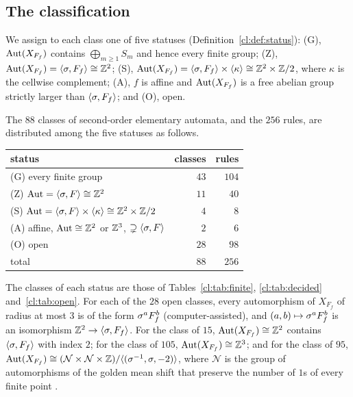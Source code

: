 \subsection{The classification}

We assign to each class one of five statuses (Definition~\ref{cl:def:status}): (G), $\operatorname{Aut}(X_{F_f})$ contains $\bigoplus_{m\ge1}S_m$ and hence every finite group; (Z), $\operatorname{Aut}(X_{F_f})=\langle\sigma,F_f\rangle\cong\mathbb{Z}^2$; (S), $\operatorname{Aut}(X_{F_f})=\langle\sigma,F_f\rangle\times\langle\kappa\rangle\cong\mathbb{Z}^2\times\mathbb{Z}/2$, where $\kappa$ is the cellwise complement; (A), $f$ is affine and $\operatorname{Aut}(X_{F_f})$ is a free abelian group strictly larger than $\langle\sigma,F_f\rangle$; and (O), open.

\begin{theorem}[Classification]\label{thm:main}
The $88$ classes of second-order elementary automata, and the $256$ rules, are distributed among the five statuses as follows.
\begin{center}
\begin{tabular}{lrr}
\toprule
status & classes & rules\\
\midrule
(G) every finite group & $43$ & $104$\\
(Z) $\operatorname{Aut}=\langle\sigma,F\rangle\cong\mathbb{Z}^2$ & $11$ & $40$\\
(S) $\operatorname{Aut}=\langle\sigma,F\rangle\times\langle\kappa\rangle\cong\mathbb{Z}^2\times\mathbb{Z}/2$ & $4$ & $8$\\
(A) affine, $\operatorname{Aut}\cong\mathbb{Z}^2$ or $\mathbb{Z}^3$, $\supsetneq\langle\sigma,F\rangle$ & $2$ & $6$\\
(O) open & $28$ & $98$\\
\midrule
total & $88$ & $256$\\
\bottomrule
\end{tabular}
\end{center}
The classes of each status are those of Tables~\ref{cl:tab:finite}, \ref{cl:tab:decided} and~\ref{cl:tab:open}. For each of the $28$ open classes, every automorphism of $X_{F_f}$ of radius at most $3$ is of the form $\sigma^aF_f^b$ (computer-assisted), and $(a,b)\mapsto\sigma^aF_f^b$ is an isomorphism $\mathbb{Z}^2\to\langle\sigma,F_f\rangle$. For the class of $15$, $\operatorname{Aut}(X_{F_f})\cong\mathbb{Z}^2$ contains $\langle\sigma,F_f\rangle$ with index $2$; for the class of $105$, $\operatorname{Aut}(X_{F_f})\cong\mathbb{Z}^3$; and for the class of $95$, $\operatorname{Aut}(X_{F_f})\cong(\mathcal N\times\mathcal N\times\mathbb{Z})/\langle(\sigma^{-1},\sigma,-2)\rangle$, where $\mathcal N$ is the group of automorphisms of the golden mean shift that preserve the number of $1$s of every finite point \cite{PaperE}.
\end{theorem}

